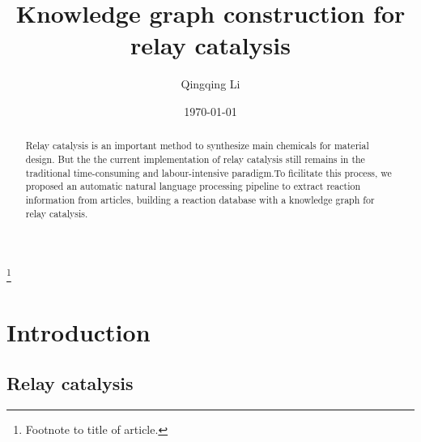 \documentclass[%
 aip,
 jmp,%
 amsmath,amssymb,
 reprint,%
]{revtex4-2}
\begin{document}

\title[Knowledge graph construction for relay catalysis]{Knowledge graph construction for relay catalysis}%
\thanks{Footnote to title of article.}

\author{Qingqing Li}

\date{\today}%

\begin{abstract}
Relay catalysis is an important method to synthesize main chemicals for material design. But the 
the current implementation of relay catalysis still remains in the traditional time-consuming 
and labour-intensive paradigm.To ficilitate this process, we proposed an automatic natural language 
processing pipeline to extract reaction information from articles, building a reaction 
database with a knowledge graph for relay catalysis.
%
\end{abstract}

\maketitle



\section{Introduction}


\subsection{Relay catalysis}
\end{document}
